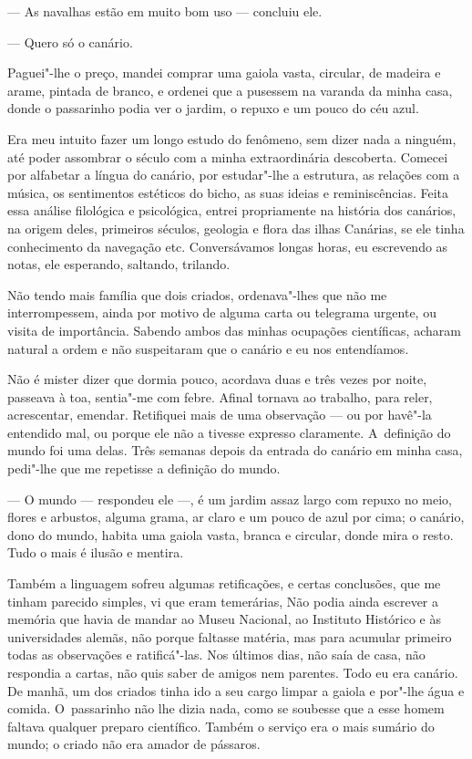 \begin{linenumbers}
--- As navalhas estão em muito bom uso --- concluiu ele.

--- Quero só o canário.

Paguei"-lhe o preço, mandei comprar uma gaiola vasta, circular, de
madeira e arame, pintada de branco, e ordenei que a pusessem na varanda
da minha casa, donde o passarinho podia ver o jardim, o repuxo e um
pouco do céu azul.

Era meu intuito fazer um longo estudo do fenômeno, sem dizer nada a
ninguém, até poder assombrar o século com a minha extraordinária
descoberta. Comecei por alfabetar a língua do canário, por estudar"-lhe a
estrutura, as relações com a música, os sentimentos estéticos do bicho,
as suas ideias e reminiscências. Feita essa análise filológica e
psicológica, entrei propriamente na história dos canários, na origem
deles, primeiros séculos, geologia e flora das ilhas Canárias, se ele
tinha conhecimento da navegação etc. Conversávamos longas horas, eu
escrevendo as notas, ele esperando, saltando, trilando.

Não tendo mais família que dois criados, ordenava"-lhes que não me
interrompessem, ainda por motivo de alguma carta ou telegrama urgente,
ou visita de importância. Sabendo ambos das minhas ocupações
científicas, acharam natural a ordem e não suspeitaram que o canário e
eu nos entendíamos.

Não é mister dizer que dormia pouco, acordava duas e três vezes por
noite, passeava à toa, sentia"-me com febre. Afinal tornava ao trabalho,
para reler, acrescentar, emendar. Retifiquei mais de uma observação ---
ou por havê"-la entendido mal, ou porque ele não a tivesse expresso
claramente. A~definição do mundo foi uma delas. Três semanas depois da
entrada do canário em minha casa, pedi"-lhe que me repetisse a definição
do mundo.

--- O mundo --- respondeu ele ---, é um jardim assaz largo com repuxo no
meio, flores e arbustos, alguma grama, ar claro e um pouco de azul por
cima; o canário, dono do mundo, habita uma gaiola vasta, branca e
circular, donde mira o resto. Tudo o mais é ilusão e mentira.

Também a linguagem sofreu algumas retificações, e certas conclusões, que
me tinham parecido simples, vi que eram temerárias, Não podia ainda
escrever a memória que havia de mandar ao Museu Nacional, ao Instituto
Histórico e às universidades alemãs, não porque faltasse matéria, mas
para acumular primeiro todas as observações e ratificá"-las. Nos últimos
dias, não saía de casa, não respondia a cartas, não quis saber de amigos
nem parentes. Todo eu era canário. De manhã, um dos criados tinha ido a
seu cargo limpar a gaiola e por"-lhe água e comida. O~passarinho não lhe
dizia nada, como se soubesse que a esse homem faltava qualquer preparo
científico. Também o serviço era o mais sumário do mundo; o criado não
era amador de pássaros.


\end{linenumbers}
